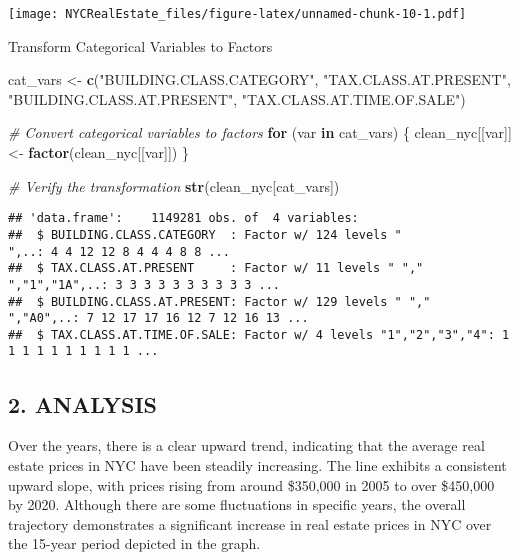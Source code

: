 \documentclass[
]{article}
\newenvironment{Shaded}{\begin{snugshade}}{\end{snugshade}}
\newcommand{\CommentTok}[1]{\textcolor[rgb]{0.56,0.35,0.01}{\textit{#1}}}
\newcommand{\ControlFlowTok}[1]{\textcolor[rgb]{0.13,0.29,0.53}{\textbf{#1}}}
\newcommand{\FunctionTok}[1]{\textcolor[rgb]{0.13,0.29,0.53}{\textbf{#1}}}
\newcommand{\NormalTok}[1]{#1}
\newcommand{\OtherTok}[1]{\textcolor[rgb]{0.56,0.35,0.01}{#1}}
\newcommand{\StringTok}[1]{\textcolor[rgb]{0.31,0.60,0.02}{#1}}
\begin{document}
\texttt{[image: NYCRealEstate\_files/figure-latex/unnamed-chunk-10-1.pdf]}

Transform Categorical Variables to Factors

\begin{Shaded}
\begin{Highlighting}[]
\NormalTok{cat\_vars }\OtherTok{\textless{}{-}} \FunctionTok{c}\NormalTok{(}\StringTok{"BUILDING.CLASS.CATEGORY"}\NormalTok{, }\StringTok{"TAX.CLASS.AT.PRESENT"}\NormalTok{, }\StringTok{"BUILDING.CLASS.AT.PRESENT"}\NormalTok{, }\StringTok{"TAX.CLASS.AT.TIME.OF.SALE"}\NormalTok{)}

\CommentTok{\# Convert categorical variables to factors}
\ControlFlowTok{for}\NormalTok{ (var }\ControlFlowTok{in}\NormalTok{ cat\_vars) \{}
\NormalTok{  clean\_nyc[[var]] }\OtherTok{\textless{}{-}} \FunctionTok{factor}\NormalTok{(clean\_nyc[[var]])}
\NormalTok{\}}

\CommentTok{\# Verify the transformation}
\FunctionTok{str}\NormalTok{(clean\_nyc[cat\_vars])}
\end{Highlighting}
\end{Shaded}

\begin{verbatim}
## 'data.frame':    1149281 obs. of  4 variables:
##  $ BUILDING.CLASS.CATEGORY  : Factor w/ 124 levels "                                            ",..: 4 4 12 12 8 4 4 4 8 8 ...
##  $ TAX.CLASS.AT.PRESENT     : Factor w/ 11 levels " ","  ","1","1A",..: 3 3 3 3 3 3 3 3 3 3 ...
##  $ BUILDING.CLASS.AT.PRESENT: Factor w/ 129 levels " ","  ","A0",..: 7 12 17 17 16 12 7 12 16 13 ...
##  $ TAX.CLASS.AT.TIME.OF.SALE: Factor w/ 4 levels "1","2","3","4": 1 1 1 1 1 1 1 1 1 1 ...
\end{verbatim}

\hypertarget{analysis}{%
\subsection{2. ANALYSIS}\label{analysis}}

Over the years, there is a clear upward trend, indicating that the
average real estate prices in NYC have been steadily increasing. The
line exhibits a consistent upward slope, with prices rising from around
\$350,000 in 2005 to over \$450,000 by 2020. Although there are some
fluctuations in specific years, the overall trajectory demonstrates a
significant increase in real estate prices in NYC over the 15-year
period depicted in the graph.
\end{document}
